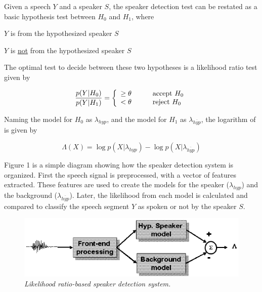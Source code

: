 \documentclass[a4paper,twocolumn]{article}
\begin{document}
Given a speech $Y$ and a speaker $S$, the speaker detection test can be restated as a basic hypothesis test between $H_0$ and $H_1$, where

\begin{description}\itemsep 0pt \parskip 1pt
    \item[$H_0$:] $Y$ is from the hypothesized speaker $S$
    \item[$H_1$:] $Y$ is \underline{not} from the hypothesized speaker $S$
\end{description}

\noindent The optimal test to decide between these two hypotheses is a likelihood ratio test given by

\begin{equation}
    \label{eq:likelihood_ratio_test}
    \frac{p(Y|H_0)}{p(Y|H_1)} = \left\{
        \begin{array}{l l}
        \geq \theta \quad\quad\quad \text{accept $H_0$}\\
        < \theta \quad\quad\quad \text{reject $H_0$}
        \end{array} \right.
\end{equation}

\noindent Naming the model for $H_0$ as $\lambda_{hyp}$, and the model for $H_1$ as $\lambda_{\overline{hyp}}$, the logarithm of  is given by

\begin{equation}
    \label{eq:log_likelihood_ratio_test}
    \Lambda(X) = \log p(X|\lambda_{hyp}) - \log p(X|\lambda_{\overline{hyp}})
\end{equation}

Figure 1 is a simple diagram showing how the speaker detection system is organized. First the speech signal is preprocessed, with a vector of features extracted. These features are used to create the models for the speaker ($\lambda_{hyp}$) and the background ($\lambda_{\overline{hyp}}$). Later, the likelihood from each model is calculated and compared to classify the speech segment $Y$ as spoken or not by the speaker $S$.

\begin{figure}[h]
    \label{fig:speaker_detection_system}
    \centering
    \includegraphics[scale=0.3]{speaker-detection-system}
    \caption{\textit{Likelihood ratio-based speaker detection system.}}
\end{figure}
\end{document}

